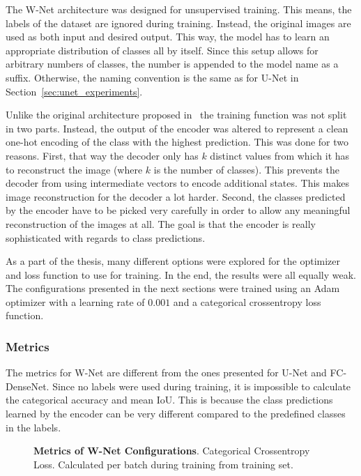 The W-Net architecture was designed for unsupervised training. This means, the labels of the dataset are ignored during training. Instead, the original images are used as both input and desired output. This way, the model has to learn an appropriate distribution of classes all by itself. Since this setup allows for arbitrary numbers of classes, the number is appended to the model name as a suffix. Otherwise, the naming convention is the same as for U-Net in Section~\ref{sec:unet_experiments}.

Unlike the original architecture proposed in~\cite{wnet17} the training function was not split in two parts. Instead, the output of the encoder was altered to represent a clean one-hot encoding of the class with the highest prediction. This was done for two reasons. First, that way the decoder only has $k$ distinct values from which it has to reconstruct the image (where $k$ is the number of classes). This prevents the decoder from using intermediate vectors to encode additional states. This makes image reconstruction for the decoder a lot harder. Second, the classes predicted by the encoder have to be picked very carefully in order to allow any meaningful reconstruction of the images at all. The goal is that the encoder is really sophisticated with regards to class predictions.

As a part of the thesis, many different options were explored for the optimizer and loss function to use for training. In the end, the results were all equally weak. The configurations presented in the next sections were trained using an Adam optimizer with a learning rate of $0.001$ and a categorical crossentropy loss function.

\subsubsection{Metrics}
The metrics for W-Net are different from the ones presented for U-Net and FC-DenseNet. Since no labels were used during training, it is impossible to calculate the categorical accuracy and mean IoU. This is because the class predictions learned by the encoder can be very different compared to the predefined classes in the labels.

\begin{figure}[h]
    \centering
            
    \caption[Metrics of W-Net Configurations]
    {\textbf{Metrics of W-Net Configurations}. Categorical Crossentropy Loss. Calculated per batch during training from training set.}
    \label{fig:wnet_train_metrics}
\end{figure}

